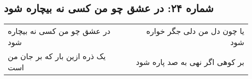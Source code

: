 \begin{center}
\section*{شماره ۲۴: در عشق چو من کسی نه بیچاره شود}
\label{sec:024}
\begin{longtable}{l p{0.5cm} r}
در عشق چو من کسی نه بیچاره شود
&&
یا چون دل من دلی جگر خواره شود
\\
یک ذره ازین بار که بر جان من است
&&
بر کوهی اگر نهی به صد پاره شود
\\
\end{longtable}
\end{center}
